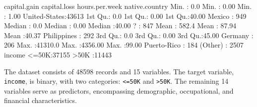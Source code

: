 \documentclass[
  11pt,
]{book}
\makeatletter
\newenvironment{Shaded}{}{}
\newcommand{\DecValTok}[1]{#1}
\newcommand{\FloatTok}[1]{#1}
\newcommand{\NormalTok}[1]{#1}
\newcommand{\SpecialCharTok}[1]{\textcolor[rgb]{0.39,0.39,0.39}{#1}}
\newenvironment{kframe}{%
\medskip{}
\setlength{\fboxsep}{.8em}
 \def\at@end@of@kframe{}%
 \ifinner\ifhmode%
  \def\at@end@of@kframe{\end{minipage}}%
  \begin{minipage}{\columnwidth}%
 \fi\fi%
 \def\FrameCommand##1{\hskip\@totalleftmargin \hskip-\fboxsep
 \colorbox{shadecolor}{##1}\hskip-\fboxsep
     \hskip-\linewidth \hskip-\@totalleftmargin \hskip\columnwidth}%
 \MakeFramed {\advance\hsize-\width
   \@totalleftmargin\z@ \linewidth\hsize
   \@setminipage}}%
 {\par\unskip\endMakeFramed%
 \at@end@of@kframe}
\renewenvironment{Shaded}{\begin{kframe}}{\end{kframe}}
\theoremstyle{definition}
\theoremstyle{definition}
\theoremstyle{definition}
\theoremstyle{definition}
\theoremstyle{remark}
\makeatother
\begin{document}
\begin{Shaded}
\begin{Highlighting}[]
\NormalTok{     capital.gain      capital.loss     hours.per.week        native.country }
\NormalTok{    Min.   }\SpecialCharTok{:}    \FloatTok{0.0}\NormalTok{   Min.   }\SpecialCharTok{:}   \FloatTok{0.00}\NormalTok{   Min.   }\SpecialCharTok{:} \FloatTok{1.00}\NormalTok{   United}\SpecialCharTok{{-}}\NormalTok{States}\SpecialCharTok{:}\DecValTok{43613}  
    \DecValTok{1}\NormalTok{st Qu.}\SpecialCharTok{:}    \FloatTok{0.0}   \DecValTok{1}\NormalTok{st Qu.}\SpecialCharTok{:}   \FloatTok{0.00}   \DecValTok{1}\NormalTok{st Qu.}\SpecialCharTok{:}\FloatTok{40.00}\NormalTok{   Mexico       }\SpecialCharTok{:}  \DecValTok{949}  
\NormalTok{    Median }\SpecialCharTok{:}    \FloatTok{0.0}\NormalTok{   Median }\SpecialCharTok{:}   \FloatTok{0.00}\NormalTok{   Median }\SpecialCharTok{:}\FloatTok{40.00}\NormalTok{   ?            }\SpecialCharTok{:}  \DecValTok{847}  
\NormalTok{    Mean   }\SpecialCharTok{:}  \FloatTok{582.4}\NormalTok{   Mean   }\SpecialCharTok{:}  \FloatTok{87.94}\NormalTok{   Mean   }\SpecialCharTok{:}\FloatTok{40.37}\NormalTok{   Philippines  }\SpecialCharTok{:}  \DecValTok{292}  
    \DecValTok{3}\NormalTok{rd Qu.}\SpecialCharTok{:}    \FloatTok{0.0}   \DecValTok{3}\NormalTok{rd Qu.}\SpecialCharTok{:}   \FloatTok{0.00}   \DecValTok{3}\NormalTok{rd Qu.}\SpecialCharTok{:}\FloatTok{45.00}\NormalTok{   Germany      }\SpecialCharTok{:}  \DecValTok{206}  
\NormalTok{    Max.   }\SpecialCharTok{:}\FloatTok{41310.0}\NormalTok{   Max.   }\SpecialCharTok{:}\FloatTok{4356.00}\NormalTok{   Max.   }\SpecialCharTok{:}\FloatTok{99.00}\NormalTok{   Puerto}\SpecialCharTok{{-}}\NormalTok{Rico  }\SpecialCharTok{:}  \DecValTok{184}  
\NormalTok{                                                        (Other)      }\SpecialCharTok{:} \DecValTok{2507}  
\NormalTok{      income     }
    \SpecialCharTok{\textless{}=}\DecValTok{50}\NormalTok{K}\SpecialCharTok{:}\DecValTok{37155}  
    \SpecialCharTok{\textgreater{}}\DecValTok{50}\NormalTok{K }\SpecialCharTok{:}\DecValTok{11443}  
                 
                 
                 
                 
   
\end{Highlighting}
\end{Shaded}

The dataset consists of 48598 records and 15 variables. The target variable, \texttt{income}, is binary, with two categories: \texttt{\textless{}=50K} and \texttt{\textgreater{}50K}. The remaining 14 variables serve as predictors, encompassing demographic, occupational, and financial characteristics.
\end{document}

